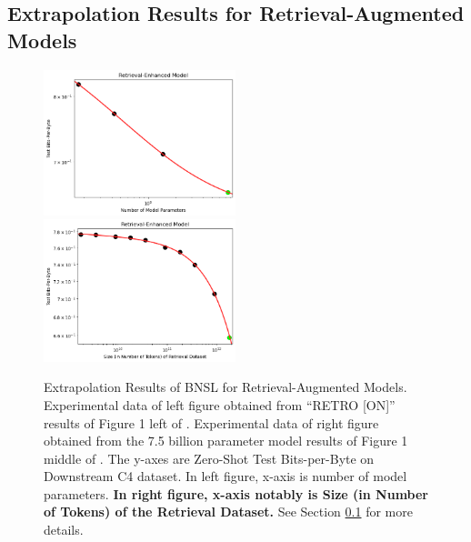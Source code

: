 \documentclass{article} %
\begin{document}
\clearpage

\subsection{Extrapolation Results for Retrieval-Augmented Models}
\label{section:retrieval}

\vspace{-3.5mm}

\begin{figure}[htbp]
    \centering
\includegraphics[width=0.497\textwidth]{figures/retrieval/retrieval__num_of_parameters.png}
\includegraphics[width=0.497\textwidth]{figures/retrieval/retrieval__retrieval_dataset_size.png}

\vspace{-3.5mm}
    \caption{
Extrapolation Results of BNSL for Retrieval-Augmented Models. Experimental data of left figure obtained from ``RETRO [ON]'' results of Figure 1 left of \cite{borgeaud2022improving}. Experimental data of right figure obtained from the 7.5 billion parameter model results of Figure 1 middle of \cite{borgeaud2022improving}. The y-axes are Zero-Shot Test Bits-per-Byte on Downstream C4 \citep{2019t5} dataset. In left figure, x-axis is number of model parameters. \textbf{In right figure, x-axis notably is Size (in Number of Tokens) of the Retrieval Dataset.} See Section \ref{section:retrieval} for more details.
    }
    \label{fig:retrieval}
\end{figure}
\end{document}
